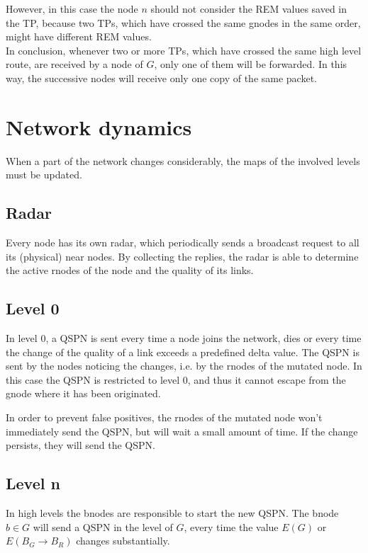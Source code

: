 \documentclass[a4paper]{article}
\begin{document}
However, in this case the node $n$ should not consider the REM
values saved in the TP, because two TPs, which have crossed the same
gnodes in the same order, might have different REM values.
\\

In conclusion, whenever two or more TPs, which have crossed the same high level
route, are received by a node of $G$, only one of them will be forwarded. In
this way, the successive nodes will receive only one copy of the same packet.

\section{Network dynamics}
When a part of the network changes considerably, the maps of the involved
levels must be updated.

\subsection{Radar}
Every node has its own radar, which periodically sends a broadcast request to
all its (physical) near nodes. By collecting the replies, the radar is able to
determine the active rnodes of the node and the quality of its links.

\subsection{Level 0}
In level 0, a QSPN is sent every time a node joins the network, dies or every
time the change of the quality of a link exceeds a predefined delta value.
The QSPN is sent by the nodes noticing the changes, i.e. by the rnodes of the
mutated node. In this case the QSPN is restricted to level 0, and thus it cannot
escape from the gnode where it has been originated.

In order to prevent false positives, the rnodes of the mutated node won't
immediately send the QSPN, but will wait a small amount of time. If the change
persists, they will send the QSPN.

\subsection{Level n}
In high levels the bnodes are responsible to start the new QSPN.
The bnode $b \in G$ will send a QSPN in the level of $G$, every time the value
$E(G)$ or\\$E(B_G\rightarrow B_R)$ changes substantially.
\end{document}
